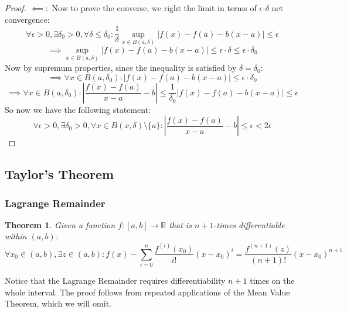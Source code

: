 \documentclass[10pt,letterpaper]{article} %
\newtheorem{thm}{Theorem}[section]
\begin{document}
\begin{proof}
$\impliedby:$ Now to prove the converse, we right the limit in terms of $\epsilon$-$\delta$ net convergence:
\begin{equation*}
\forall \epsilon > 0, \exists \delta_0 > 0, \forall \delta \leqslant \delta_0: \frac{1}{\delta}\sup_{x \in B(a, \delta)}|f(x) - f(a) - b(x-a)| \leqslant \epsilon
\end{equation*}
\begin{equation*}
\implies \sup_{x \in B(a, \delta)}|f(x) - f(a) - b(x-a)| \leqslant \epsilon \cdot \delta \leqslant \epsilon \cdot \delta_0
\end{equation*}
Now by supremum properties, since the inequality is satisfied by $\delta = \delta_0$:
\begin{equation*}
\implies \forall x \in B(a, \delta_0):  |f(x) - f(a) - b(x-a)| \leqslant \epsilon \cdot \delta_0
\end{equation*}
\begin{equation*}
\implies \forall x \in B(a, \delta_0): \left|\frac{f(x) - f(a)}{x-a} - b\right| \leqslant \frac{1}{\delta_0}|f(x) - f(a) - b(x-a)| \leqslant \epsilon
\end{equation*}
So now we have the following statement:
\begin{equation*}
\forall \epsilon > 0, \exists \delta_0 > 0, \forall x \in B(x, \delta)\setminus\{a\}: \left|\frac{f(x) - f(a)}{x-a} - b\right| \leqslant \epsilon < 2\epsilon
\end{equation*}
\end{proof}

\subsection{Taylor's Theorem}
\subsubsection{Lagrange Remainder}
\begin{thm}
Given a function $f: [a, b] \xrightarrow{} \mathbb{R}$ that is $n+1$-times differentiable within $(a, b)$:
\begin{equation*}
\forall x_0 \in (a, b), \exists z \in (a, b): f(x) - \sum_{i=0}^{n}\frac{f^{(i)}(x_0)}{i!}(x-x_0)^i = \frac{f^{(n+1)}(z)}{(n+1)!}(x-x_0)^{n+1}
\end{equation*}
\end{thm}
Notice that the Lagrange Remainder requires differentiability $n+1$ times on the whole interval. The proof follows from repeated applications of the Mean Value Theorem, which we will omit.\\
\end{document}
